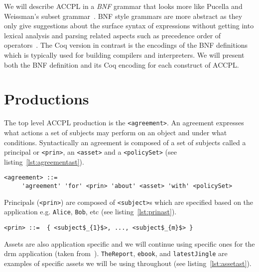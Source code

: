 \documentclass[runningheads,a4paper]{llncs}
\newcommand{\syn}{\texttt}
\begin{document}
We will describe \ac{ACCPL} in a \emph{BNF} grammar that looks more like Pucella and Weissman's subset grammar~\cite{pucella2006}. BNF style grammars are more abstract as they only give suggestions about the surface syntax of expressions without getting into lexical analysis and parsing related aspects such as precedence order of operators~\cite{piercesf2011}. The Coq version in contrast is the encodings of the BNF definitions which is typically used for building compilers and interpreters. We will present both the BNF definition and its Coq encoding for each construct of \ac{ACCPL}. 

\section{Productions} \label{sec:productionast}

The top level \ac{ACCPL} production is the \syn{<agreement>}. An agreement expresses what actions a set of subjects may perform on an object and under what conditions. Syntactically an agreement is composed of a set of subjects called a principal or \syn{<prin>}, an \syn{<asset>} and a \syn{<policySet>} (see listing~\ref{lst:agreementast}).

\lstset{language=AST}
\begin{minipage}[c]{0.95\textwidth}
\begin{lstlisting}[frame=single, caption={agreement},label={lst:agreementast}]
<agreement> ::= 
     'agreement' 'for' <prin> 'about' <asset> 'with' <policySet> 
\end{lstlisting}
\end{minipage} 

Principals (\syn{<prin>}) are composed of \syn{<subject>}s which are specified based on the application e.g. \syn{Alice}, \syn{Bob}, etc (see listing~\ref{lst:prinast}).


\lstset{mathescape, language=AST}  
\begin{lstlisting}[frame=single, caption={prin},label={lst:prinast}]
<prin> ::=  { <subject$_{1}$>, ..., <subject$_{m}$> }
\end{lstlisting}

Assets are also application specific and we will continue using specific ones for the \ac{drm} application (taken from~\cite{pucella2006}). \syn{TheReport}, \syn{ebook}, and \syn{latestJingle} are examples of specific assets we will be using throughout (see listing~\ref{lst:assetast}). 
\end{document}
